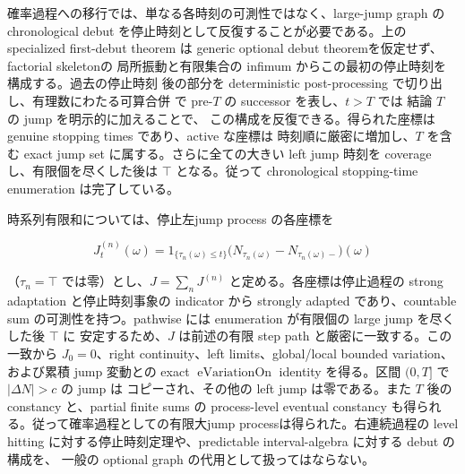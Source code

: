 確率過程への移行では、単なる各時刻の可測性ではなく、large-jump graph の
chronological debut を停止時刻として反復することが必要である。上の specialized
first-debut theorem は generic optional debut theoremを仮定せず、factorial skeletonの
局所振動と有限集合の infimum からこの最初の停止時刻を構成する。過去の停止時刻
後の部分を deterministic post-processing で切り出し、有理数にわたる可算合併
で pre-$T$ の successor を表し、$t>T$ では 結論 $T$ の jump を明示的に加えることで、
この構成を反復できる。得られた座標は genuine stopping times であり、active な座標は
時刻順に厳密に増加し、$T$ を含む exact jump set に属する。さらに全ての大きい left jump
時刻を coverage し、有限個を尽くした後は $\top$ となる。従って chronological stopping-time
enumeration は完了している。

時系列有限和については、停止左jump process の各座標を

\[
 J^{(n)}_t(\omega)=1_{\{\tau_n(\omega)\leq t\}}
 \bigl(N_{\tau_n(\omega)}-N_{\tau_n(\omega)-}\bigr)(\omega)
\]

（$\tau_n=\top$ では零）とし、$J=\sum_n J^{(n)}$ と定める。各座標は停止過程の
strong adaptation と停止時刻事象の indicator から strongly adapted であり、countable sum
の可測性を持つ。pathwise には enumeration が有限個の large jump を尽くした後 $\top$ に
安定するため、$J$ は前述の有限 step path と厳密に一致する。この一致から $J_0=0$、right
continuity、left limits、global/local bounded variation、および累積 jump 変動との
exact $\operatorname{eVariationOn}$ identity を得る。区間 $(0,T]$ で $|\Delta N|>c$ の jump は
コピーされ、その他の left jump は零である。また $T$ 後の constancy と、partial finite sums
の process-level eventual constancy も得られる。従って確率過程としての有限大jump processは得られた。右連続過程の level
hitting に対する停止時刻定理や、predictable interval-algebra に対する debut の構成を、
一般の optional graph の代用として扱ってはならない。
